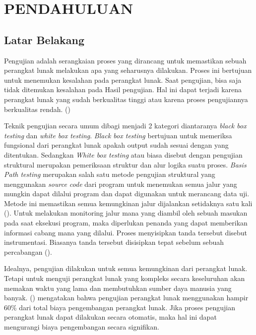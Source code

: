 \section*{PENDAHULUAN} %
\subsection*{Latar Belakang}
Pengujian adalah serangkaian proses yang dirancang untuk memastikan sebuah perangkat lunak melakukan apa yang seharusnya dilakukan. Proses ini bertujuan untuk menemukan kesalahan pada perangkat lunak. Saat pengujian, bisa saja tidak ditemukan kesalahan pada Hasil pengujian. Hal ini dapat terjadi karena perangkat lunak yang sudah berkualitas tinggi atau karena proses pengujiannya berkualitas rendah. (\cite{GLENFORD2012})

Teknik pengujian secara umum dibagi menjadi 2 kategori diantaranya \textit{black box testing} dan \textit{white box testing}. \textit{Black box testing} bertujuan untuk memeriksa fungsional dari perangkat lunak apakah output sudah sesuai dengan yang ditentukan. Sedangkan \textit{White box testing} atau biasa disebut dengan pengujian struktural merupakan pemeriksaan struktur dan alur logika suatu proses. \textit{Basis Path testing} merupakan salah satu metode pengujian struktural yang menggunakan \textit{source code} dari program untuk menemukan semua jalur yang mungkin dapat dilalui program dan dapat digunakan untuk merancang data uji. Metode ini memastikan semua kemungkinan jalur dijalankan setidaknya satu kali (\cite{BASU2015}). Untuk melakukan monitoring jalur mana yang diambil oleh sebuah masukan pada saat eksekusi program, maka diperlukan penanda yang dapat memberikan informasi cabang mana yang dilalui. Proses menyisipkan tanda tersebut disebut instrumentasi. Biasanya tanda tersebut disisipkan tepat sebelum sebuah percabangan (\cite{TIKIR2011}). 

Idealnya, pengujian dilakukan untuk semua kemungkinan dari perangkat lunak. Tetapi untuk menguji perangkat lunak yang kompleks secara keseluruhan akan memakan waktu yang lama dan membutuhkan sumber daya manusia yang banyak. \citeauthor{KUMAR20168} (\cite*{KUMAR20168}) mengatakan bahwa pengujian perangkat lunak menggunakan hampir 60\% dari total biaya pengembangan perangkat lunak. Jika proses pengujian perangkat lunak dapat dilakukan secara otomatis, maka hal ini dapat mengurangi biaya pengembangan secara signifikan. 

